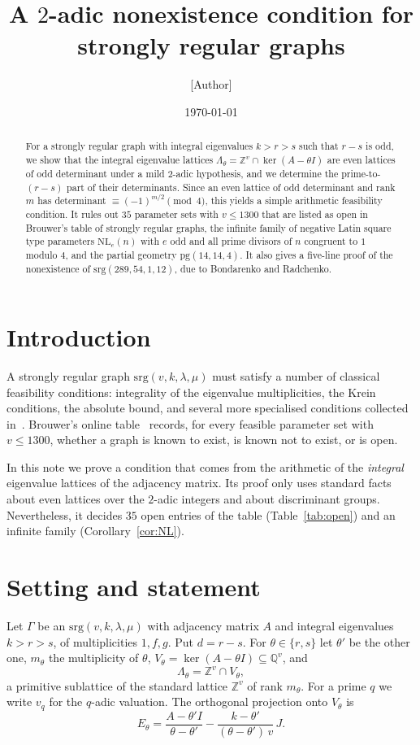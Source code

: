 \documentclass[11pt]{amsart}
\title{A $2$-adic nonexistence condition for strongly regular graphs}
\author{[Author]}
\date{\today}
\theoremstyle{remark}
\newcommand{\Z}{\mathbb{Z}}
\newcommand{\Q}{\mathbb{Q}}
\begin{document}
\begin{abstract}
For a strongly regular graph with integral eigenvalues $k>r>s$ such that $r-s$ is odd, we show that the integral
eigenvalue lattices $\Lambda_\theta=\Z^v\cap\ker(A-\theta I)$ are even lattices of odd determinant under a mild
$2$-adic hypothesis, and we determine the prime-to-$(r-s)$ part of their determinants. Since an even lattice of odd
determinant and rank $m$ has determinant $\equiv(-1)^{m/2}\pmod 4$, this yields a simple arithmetic feasibility
condition. It rules out $35$ parameter sets with $v\le 1300$ that are listed as open in Brouwer's table of strongly
regular graphs, the infinite family of negative Latin square type parameters $\mathrm{NL}_e(n)$ with $e$ odd and all
prime divisors of $n$ congruent to $1$ modulo $4$, and the partial geometry $\mathrm{pg}(14,14,4)$. It also gives a
five-line proof of the nonexistence of $\mathrm{srg}(289,54,1,12)$, due to Bondarenko and Radchenko.
\end{abstract}
\maketitle

\section{Introduction}
A strongly regular graph $\mathrm{srg}(v,k,\lambda,\mu)$ must satisfy a number of classical feasibility conditions:
integrality of the eigenvalue multiplicities, the Krein conditions, the absolute bound, and several more specialised
conditions collected in~\cite{BvM}. Brouwer's online table~\cite{Btab} records, for every feasible parameter set with
$v\le 1300$, whether a graph is known to exist, is known not to exist, or is open.

In this note we prove a condition that comes from the arithmetic of the \emph{integral} eigenvalue lattices of the
adjacency matrix. Its proof only uses standard facts about even lattices over the $2$-adic integers and about
discriminant groups. Nevertheless, it decides $35$ open entries of the table (Table~\ref{tab:open}) and an infinite
family (Corollary~\ref{cor:NL}).

\section{Setting and statement}
Let $\Gamma$ be an $\mathrm{srg}(v,k,\lambda,\mu)$ with adjacency matrix $A$ and integral eigenvalues $k>r>s$, of
multiplicities $1,f,g$. Put $d=r-s$. For $\theta\in\{r,s\}$ let $\theta'$ be the other one, $m_\theta$ the
multiplicity of $\theta$, $V_\theta=\ker(A-\theta I)\subseteq\Q^v$, and
\[
\Lambda_\theta=\Z^v\cap V_\theta ,
\]
a primitive sublattice of the standard lattice $\Z^v$ of rank $m_\theta$. For a prime $q$ we write $v_q$ for the
$q$-adic valuation. The orthogonal projection onto $V_\theta$ is
\begin{equation}\label{eq:E}
E_\theta=\frac{A-\theta' I}{\theta-\theta'}-\frac{k-\theta'}{(\theta-\theta')\,v}\,J .
\end{equation}
\end{document}
